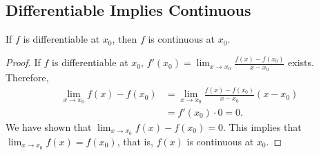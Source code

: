 \subsection{Differentiable Implies Continuous}
\begin{theorem}
If \( f \) is differentiable at \( x_0 \), then \( f \) is continuous at
\( x_0 \).
\end{theorem}
\begin{proof}
If \( f \) is differentiable at \( x_0 \),
\( f'(x_0) = \lim_{x \to x_0} \frac{f(x) - f(x_0)}{x - x_0} \) exists.
Therefore,
\begin{align*}
    \lim_{x \to x_0} f(x) - f(x_0)
        & = \lim_{x \to x_0} \frac{f(x) - f(x_0)}{x - x_0} (x - x_0) \\
        & = f'(x_0) \cdot 0 = 0.
\end{align*}
We have shown that \( \lim_{x \to x_0} f(x) - f(x_0) = 0 \). This
implies that \( \lim_{x \to x_0} f(x) = f(x_0) \), that is, \( f(x) \)
is continuous at \( x_0 \).
\end{proof}
